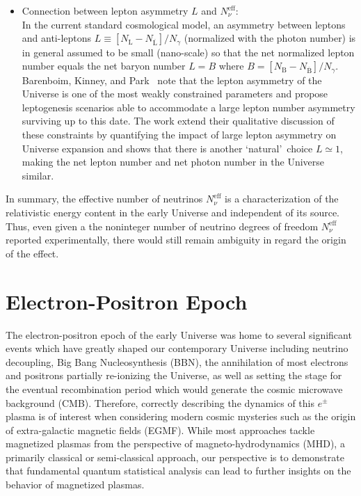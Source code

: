 \documentclass[universe,article,submit,moreauthors,pdftex,a4paper]{Definitions/mdpi}
\begin{document}
\begin{itemize}
\item Connection between lepton asymmetry $L$ and $N_\nu^{\mathrm{eff}}$:\\
In the current standard cosmological model, an asymmetry between leptons and anti-leptons $L\equiv  [N_\mathrm{L}-N_{\overline{\mathrm{L}}}] /N_\gamma $  (normalized with the photon number) is in general assumed to be small (nano-scale) so that the net normalized lepton number equals the net baryon number $L=B$ where $B=[N_\mathrm{B}-N_{\overline{\mathrm{B}}}]/N_\gamma $. Barenboim, Kinney, and Park~\cite{Barenboim:2016shh,Barenboim:2017dfq}  note that the lepton asymmetry of the Universe is one of the most weakly constrained parameters and propose leptogenesis scenarios able to accommodate a large lepton number asymmetry surviving up to this date. The work \cite{Yang:2018oqg}  extend their qualitative discussion of these constraints by quantifying the impact of large lepton asymmetry on Universe expansion and shows that there is another \lq natural\rq\ choice  $L\simeq 1$, making the  net lepton number and net photon number in the Universe similar. 

\end{itemize}
In summary, the effective number of neutrinos $N_\nu^{\mathrm{eff}}$ is a characterization of the relativistic energy content
in the early Universe and independent of its source. Thus, even given a the noninteger number of neutrino degrees of freedom $N_\nu^{\mathrm{eff}}$ reported experimentally, there would still remain ambiguity in regard the origin of the effect.
\section{Electron-Positron Epoch}\label{sec:ElectronPositron}
The electron-positron epoch of the early Universe was home to several significant events which have greatly shaped our contemporary Universe including neutrino decoupling, Big Bang Nucleosynthesis (BBN), the annihilation of most electrons and positrons partially re-ionizing the Universe, as well as setting the stage for the eventual recombination period which would generate the cosmic microwave background (CMB). Therefore, correctly describing the dynamics of this $e^{\pm}$ plasma is of interest when considering modern cosmic mysteries such as the origin of extra-galactic magnetic fields (EGMF). While most approaches tackle magnetized plasmas from the perspective of magneto-hydrodynamics (MHD), a primarily classical or semi-classical approach, our perspective is to demonstrate that fundamental quantum statistical analysis can lead to further insights on the behavior of magnetized plasmas.
\end{document}
